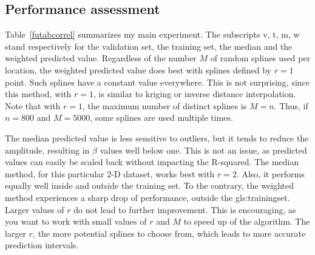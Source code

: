 \documentclass[oneside,10pt]{book}
\begin{document}
\subsection{Performance assessment}\label{fpe1s}

Table~\ref{futabcorrel} summarizes my main experiment. The subscripts v, t, m, w stand respectively for the validation set, the training set, the median and the weighted predicted value. Regardless of the number $M$ of random splines used per location, the weighted predicted value does best with splines defined by $r=1$ point. Such splines have a constant value everywhere. This is not surprising, since this method, with $r=1$, is similar to kriging or inverse distance interpolation. Note that with $r=1$, the maximum number of distinct splines is $M=n$. Thus, if $n=800$ and $M=5000$, some splines are used multiple times. 

The median predicted value is less sensitive to outliers, but it tends to reduce the amplitude, resulting in $\beta$ values well below one. This is not an issue, as predicted values can easily be scaled back without impacting the R-squared. The median method, for this particular 2-D dataset, works best with $r=2$. Also, it performs equally well inside and outside the training set. To the contrary, the weighted method experiences a sharp drop of performance, outside the \gls{gls:trainingset}.
Larger values of $r$ do not lead to further improvement. This is encouraging, as you want to work with small values of $r$ and $M$ to speed up of the algorithm.  The larger $r$, the
more potential splines to choose from, which leads to more accurate prediction intervals.
\end{document}
